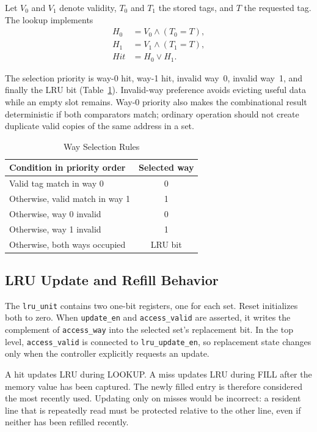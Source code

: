 \documentclass[conference]{IEEEtran}
\begin{document}
Let $V_0$ and $V_1$ denote validity, $T_0$ and $T_1$ the stored tags,
and $T$ the requested tag. The lookup implements
\begin{align}
H_0 &= V_0 \wedge (T_0 = T), \\
H_1 &= V_1 \wedge (T_1 = T), \\
\mathit{Hit} &= H_0 \vee H_1 .
\end{align}

The selection priority is way-0 hit, way-1 hit, invalid way~0, invalid
way~1, and finally the LRU bit (Table~\ref{tab:waysel}). Invalid-way
preference avoids evicting useful data while an empty slot remains.
Way-0 priority also makes the combinational result deterministic if
both comparators match; ordinary operation should not create duplicate
valid copies of the same address in a set.

\begin{table}[!t]
\caption{Way Selection Rules}
\label{tab:waysel}
\centering
\begin{tabular}{lc}
\toprule
Condition in priority order & Selected way \\
\midrule
Valid tag match in way 0 & 0 \\
Otherwise, valid match in way 1 & 1 \\
Otherwise, way 0 invalid & 0 \\
Otherwise, way 1 invalid & 1 \\
Otherwise, both ways occupied & LRU bit \\
\bottomrule
\end{tabular}
\end{table}

\subsection{LRU Update and Refill Behavior}

The \texttt{lru\_unit} contains two one-bit registers, one for each set.
Reset initializes both to zero. When \texttt{update\_en} and
\texttt{access\_valid} are asserted, it writes the complement of
\texttt{access\_way} into the selected set's replacement bit. In the
top level, \texttt{access\_valid} is connected to
\texttt{lru\_update\_en}, so replacement state changes only when the
controller explicitly requests an update.

A hit updates LRU during LOOKUP. A miss updates LRU during FILL after
the memory value has been captured. The newly filled entry is therefore
considered the most recently used. Updating only on misses would be
incorrect: a resident line that is repeatedly read must be protected
relative to the other line, even if neither has been refilled recently.
\end{document}
